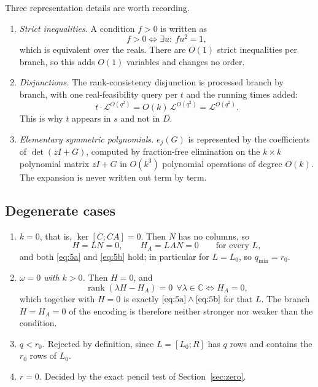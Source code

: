 Three representation details are worth recording.

\begin{enumerate}
\item \emph{Strict inequalities.} A condition $f>0$ is written as
\[
f>0\iff\exists u:\ fu^2=1,
\]
which is equivalent over the reals. There are $O(1)$ strict inequalities per
branch, so this adds $O(1)$ variables and changes no order.
\item \emph{Disjunctions.} The rank-consistency disjunction is processed branch
by branch, with one real-feasibility query per $t$ and the running times
added:
\[
t\cdot\mathcal L^{O(q^2)}=O(k)\,\mathcal L^{O(q^2)}=\mathcal L^{O(q^2)} .
\]
This is why $t$ appears in $s$ and not in $D$.
\item \emph{Elementary symmetric polynomials.} $e_j(G)$ is represented by the
coefficients of $\det(zI+G)$, computed by fraction-free elimination on the
$k\times k$ polynomial matrix $zI+G$ in $O(k^3)$ polynomial operations of
degree $O(k)$. The expansion is never written out term by term.
\end{enumerate}

\subsection{Degenerate cases}\label{sec:deg}

\begin{enumerate}
\item \emph{$k=0$}, that is, $\ker[C;CA]=0$. Then $N$ has no columns, so
\[
H=LN=0,\qquad H_A=LAN=0\qquad\text{for every }L,
\]
and both \eqref{eq:5a} and \eqref{eq:5b} hold; in particular for $L=L_0$, so
$q_{\min}=r_0$.
\item \emph{$\omega=0$ with $k>0$.} Then $H=0$, and
\[
\operatorname{rank}(\lambda H-H_A)=0\ \ \forall\lambda\in\mathbb C
\iff H_A=0,
\]
which together with $H=0$ is exactly $\eqref{eq:5a}\wedge\eqref{eq:5b}$ for
that $L$. The branch $H=H_A=0$ of the encoding is therefore neither stronger
nor weaker than the condition.
\item \emph{$q<r_0$.} Rejected by definition, since $L=[L_0;R]$ has $q$ rows
and contains the $r_0$ rows of $L_0$.
\item \emph{$r=0$.} Decided by the exact pencil test of Section~\ref{sec:zero}.
\end{enumerate}
